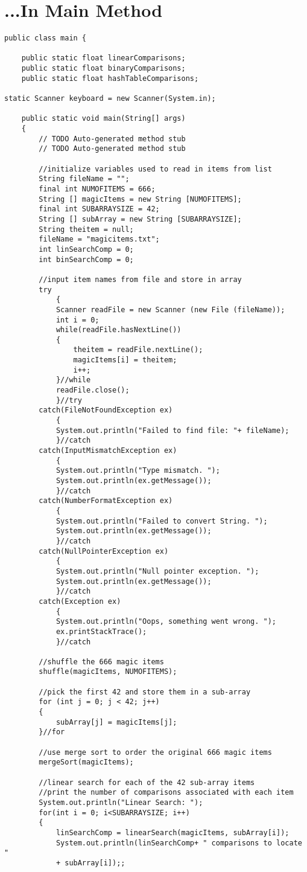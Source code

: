 \documentclass{article}
\begin{document}
\small
\section{...In Main Method}
\begin{lstlisting}[frame =single,
backgroundcolor = \color{grey!12}]
public class main {

	public static float linearComparisons;
	public static float binaryComparisons;
	public static float hashTableComparisons;
	
static Scanner keyboard = new Scanner(System.in);

	public static void main(String[] args) 
	{
		// TODO Auto-generated method stub
		// TODO Auto-generated method stub

		//initialize variables used to read in items from list
		String fileName = ""; 
		final int NUMOFITEMS = 666;
		String [] magicItems = new String [NUMOFITEMS];
		final int SUBARRAYSIZE = 42;
		String [] subArray = new String [SUBARRAYSIZE];
		String theitem = null;
		fileName = "magicitems.txt";
		int linSearchComp = 0;
		int binSearchComp = 0;
		
		//input item names from file and store in array
		try
			{
			Scanner readFile = new Scanner (new File (fileName));
			int i = 0; 
			while(readFile.hasNextLine())
			{
				theitem = readFile.nextLine();
				magicItems[i] = theitem;
				i++;
			}//while
			readFile.close();
			}//try
		catch(FileNotFoundException ex)
			{
			System.out.println("Failed to find file: "+ fileName);
			}//catch
		catch(InputMismatchException ex)
			{
			System.out.println("Type mismatch. ");
			System.out.println(ex.getMessage());
			}//catch
		catch(NumberFormatException ex)
			{
			System.out.println("Failed to convert String. ");
			System.out.println(ex.getMessage());
			}//catch
		catch(NullPointerException ex)
			{
			System.out.println("Null pointer exception. ");
			System.out.println(ex.getMessage());
			}//catch
		catch(Exception ex)
			{
			System.out.println("Oops, something went wrong. ");
			ex.printStackTrace();
			}//catch

		//shuffle the 666 magic items
		shuffle(magicItems, NUMOFITEMS);
		
		//pick the first 42 and store them in a sub-array
		for (int j = 0; j < 42; j++)
		{
			subArray[j] = magicItems[j];
		}//for
		
		//use merge sort to order the original 666 magic items
		mergeSort(magicItems);
		
		//linear search for each of the 42 sub-array items
		//print the number of comparisons associated with each item
		System.out.println("Linear Search: ");
		for(int i = 0; i<SUBARRAYSIZE; i++)
		{
			linSearchComp = linearSearch(magicItems, subArray[i]);
			System.out.println(linSearchComp+ " comparisons to locate "
			+ subArray[i]);;
			

\end{lstlisting}
\end{document}
